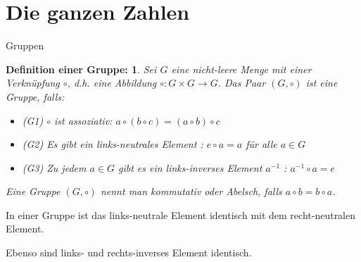 \documentclass[german]{beamer}
\newtheorem*{mytheorem2}{{\bf Definition einer Gruppe}:}
\begin{document}

\section{Die ganzen Zahlen}

\frame{\sectionpage}

\begin{frame}{Gruppen}

\begin{mytheorem2}
Sei $G$ eine nicht-leere Menge mit einer Verkn\"upfung $\circ$, d.h.
eine Abbildung $\circ : G \times G \rightarrow G$.  Das Paar $(G,\circ)$ ist eine Gruppe,
falls:
\begin{itemize}
\item (G1) $\circ$ ist assoziativ: $a \circ ( b \circ c ) = ( a \circ b ) \circ c$
\item (G2) Es gibt ein links-neutrales Element : $e \circ a = a$ f\"ur alle $a \in G$
\item (G3) Zu jedem $a \in G$ gibt es ein links-inverses Element $a^{-1}$ : $a^{-1} \circ a = e$
\end{itemize}
Eine Gruppe $(G,\circ)$ nennt man kommutativ oder Abelsch, falls 
$a \circ b = b \circ a$.
\end{mytheorem2}

In einer Gruppe ist das links-neutrale Element identisch mit dem 
recht-neutralen Element. 

Ebenso sind links- und rechts-inverses Element identisch.

\end{frame}
\end{document}
